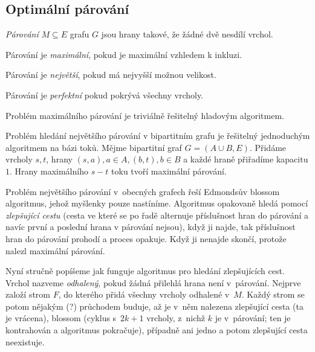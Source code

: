 \subsection{Optimální párování}


\begin{definition}
    {\em Párování} $M \subseteq E$ grafu $G$ jsou hrany takové, že
    žádné dvě nesdílí vrchol.

    Párování je {\em maximální}, pokud je maximální vzhledem k inkluzi.

    Párování je {\em největší}, pokud má nejvyšší možnou velikost.

    Párování je {\em perfektní} pokud pokrývá všechny vrcholy.
\end{definition}

Problém maximálního párování je triviálně řešitelný hladovým
algoritmem.

Problém hledání největšího párování v bipartitním grafu je řešitelný
jednoduchým algoritmem na bázi toků. Mějme bipartitní graf
$G = (A \cup B, E)$. Přidáme vrcholy $s, t$,
hrany $(s, a), a \in A, (b, t), b \in B$ a každé hraně přiřadíme
kapacitu $1$. Hrany maximálního $s-t$ toku tvoří maximální párování.


Problém největšího párování v~obecných grafech řeší Edmondsův blossom
algoritmus, jehož myšlenky pouze nastíníme.
Algoritmus opakovaně hledá pomocí {\em zlepšující
cestu} (cesta ve které
se po řadě alternuje příslušnost hran do párování a navíc první a
poslední hrana v párování nejsou), když ji najde, tak příslušnost hran do
párování prohodí a proces opakuje. Když ji nenajde skončí, protože
nalezl maximální párování.

Nyní stručně popíšeme jak funguje algoritmus pro hledání zlepšujících
cest. Vrchol nazveme {\em odhalený}, pokud žádná přilehlá hrana není v~párování.
Nejprve založí strom $F$, do kterého přidá všechny vrcholy odhalené
v~$M$. Každý strom se potom nějakým (?) průchodem buduje, až je v~něm nalezena zlepšující
cesta (ta je vrácena), blossom (cyklus s~$2k+1$ vrcholy, z~nichž $k$ je
v~párování; ten je kontrahován a algoritmus pokračuje), případně ani
jedno a potom zlepšující cesta neexistuje.

